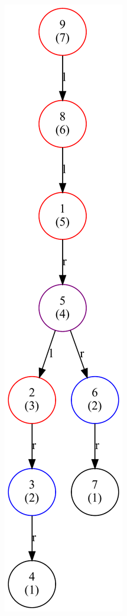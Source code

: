 \begin{figure}[hbt]
{        \includegraphics[scale = 0.32]{img/gv/aufg2_6_Delete99}\label{fig:splay-delete99}}
    \qquad
\end{figure}
